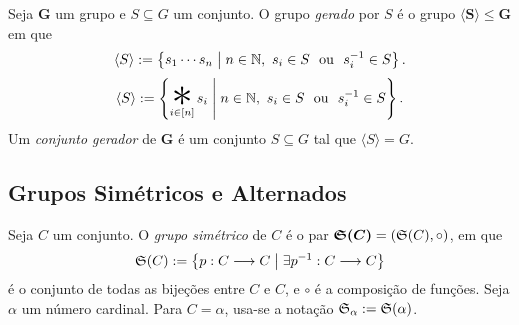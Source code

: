 \begin{defi}
Seja $\bm G$ um grupo e $S \subseteq G$ um conjunto. O grupo \emph{gerado} por $S$ é o grupo $\bm{\langle S \rangle} \leq \bm G$ em que
	\begin{equation*}
	\langle S \rangle := \left\{s_1 \cdots s_n \;\middle\vert\; n \in \mathbb{N},\ s_i \in S \text{\ \ ou\ \ } s_i^{-1} \in S \right\}.
	\end{equation*}
	\begin{equation*}
	\langle S \rangle := \set{\bigopb_{i \in [n]} s_i}{n \in \N,\ s_i \in S \ou s_i\inv \in S}.
	\end{equation*}
\noindent
Um \emph{conjunto gerador} de $\bm G$ é um conjunto $S \subseteq G$ tal que $\langle S \rangle = G$.
\end{defi}










\subsection{Grupos Simétricos e Alternados}

\begin{defi}
Seja $C$ um conjunto. O \emph{grupo simétrico} de $C$ é o par $\bm{\mathfrak{S}(C)} = (\mathfrak{S}(C),\circ)$, em que	
	\begin{equation*}
	\mathfrak{S}(C) := \left\{p: C \longrightarrow C \;\middle\vert\; \exists p^{-1}: C \longrightarrow C \right\}
	\end{equation*}
é o conjunto de todas as bijeções entre $C$ e $C$, e $\circ$ é a composição de funções. Seja $\alpha$ um número cardinal. Para $C = \alpha$, usa-se a notação $\mathfrak{S}_{\alpha} := \mathfrak{S}(\alpha)$.
\end{defi}

